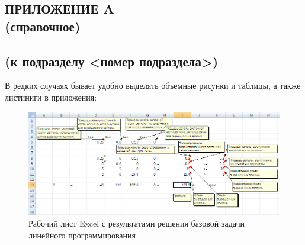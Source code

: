 \renewcommand{\thefigure}{\Asbuk{section}.\arabic{figure}}
\renewcommand{\thetable}{\Asbuk{section}.\arabic{table}}
\renewcommand{\thelstlisting}{\Asbuk{section}.\arabic{lstlisting}}

\pagestyle{fancy}
\thispagestyle{plain} 

\begin{landscape}
\section*{ПРИЛОЖЕНИЕ A\\(справочное)\\<название приложения>\\(к подразделу <номер подраздела>)}

\setcounter{section}{1}
\setcounter{figure}{0}
\setcounter{table}{0}
\setcounter{lstlisting}{0}

В редких случаях бывает удобно выделять объемные рисунки и таблицы, а также листиниги в приложения:
  
\begin{figure}[h]
\centering
  \includegraphics[width=0.8\linewidth]{pic/excel}
  \caption{Рабочий лист Excel с результатами решения базовой задачи линейного программирования}
\end{figure}

\end{landscape}

\newpage

